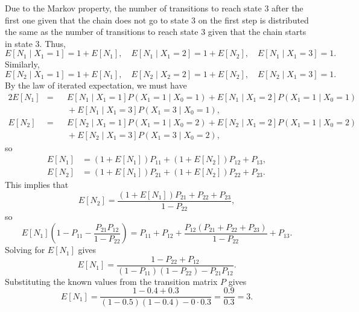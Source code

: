 \documentclass{homework}
\begin{document}
\begin{alphaparts}
		\questionpart Due to the Markov property, the number of transitions to reach state 3 after the first one given that the chain does not go to state 3 on the first step is distributed the same as the number of transitions to reach state 3 given that the chain starts in state 3. Thus,
		\begin{equation*}
			E[N_1 \mid X_1 = 1] = 1 + E[N_1], \quad E[N_1 \mid X_1 = 2] = 1 +E[N_2], \quad E[N_1 \mid X_1 = 3] = 1.
		\end{equation*}
		Similarly,
		\begin{equation*}
			E[N_2 \mid X_1 = 1] = 1 + E[N_1], \quad E[N_2 \mid X_2 = 2] = 1 + E[N_2], \quad E[N_2 \mid X_1 = 3] = 1.
		\end{equation*}
		By the law of iterated expectation, we must have
		\begin{alignat*}{2}
			E[N_1] &{}={} &&E[N_1 \mid X_1 = 1]P(X_1 = 1 \mid X_0=1) + E[N_1 \mid X_1=2]P(X_1=1 \mid X_0=1) \\
			&&&{}+ E[N_1 \mid X_1=3]P(X_1=3 \mid X_0=1), \\[0.5em]
			E[N_2] &{}={} &&E[N_2 \mid X_1 = 1]P(X_1 = 1 \mid X_0=2) + E[N_2 \mid X_1=2]P(X_1=1 \mid X_0=2) \\
			&&&{}+ E[N_2 \mid X_1=3]P(X_1=3 \mid X_0=2),
		\end{alignat*}
		so
		\begin{align*}
			E[N_1] &= (1 + E[N_1])P_{11} + (1+E[N_2])P_{12} + P_{13}, \\
			E[N_2] &= (1 + E[N_1])P_{21} + (1+E[N_2])P_{22} + P_{23}.
		\end{align*}
		This implies that
		\begin{equation*}
			E[N_2] = \frac{(1+E[N_1])P_{21} + P_{22} + P_{23}}{1 - P_{22}},
		\end{equation*}
		so
		\begin{equation*}
			E[N_1]\left(1-P_{11} - \frac{P_{21}P_{12}}{1-P_{22}}\right) = P_{11} +P_{12} + \frac{P_{12}(P_{21} + P_{22} + P_{23})}{1-P_{22}} + P_{13}.
		\end{equation*}
		Solving for $E[N_1]$ gives
		\begin{equation*}
			E[N_1] = \frac{1-P_{22} + P_{12}}{(1-P_{11})(1-P_{22}) - P_{21}P_{12}}.
		\end{equation*}
		Substituting the known values from the transition matrix $P$ gives
		\begin{equation*}
			E[N_1] = \frac{1 - 0.4 + 0.3}{(1-0.5)(1-0.4) - 0\cdot0.3} = \frac{0.9}{0.3} = 3.
		\end{equation*}
		

\end{alphaparts}
\end{document}
